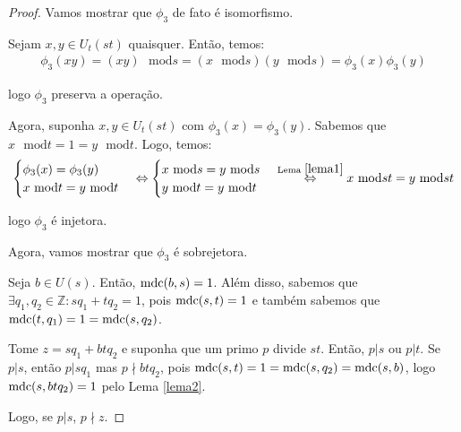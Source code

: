 \begin{proof}
		
		\vspace{0.3cm}\par Vamos mostrar que $\phi_3$ de fato é isomorfismo.
		\par\vspace{0.3cm} Sejam $x,y\in U_t(st)$ quaisquer. Então, temos:
		\begin{align*}
		\phi_3(xy) = (xy)\text{ }\mathrm{mod} s = (x\text{ }\mathrm{mod} s)(y\text{ }\mathrm{mod} s) = \phi_3(x)\phi_3(y)
		\end{align*}
		\par\vspace{0.3cm}logo $\phi_3$ preserva a operação.
		\par\vspace{0.3cm} Agora, suponha $x,y\in U_t(st)$ com $\phi_3(x) = \phi_3(y)$. Sabemos que $x\text{ }\mathrm{mod} t = 1 = y\text{ }\mathrm{mod} t$. Logo, temos:
		\begin{align*}
		\begin{cases}
		\phi_3(x) = \phi_3(y) \\
		x\text{ }\mathrm{mod} t = y\text{ }\mathrm{mod} t
		\end{cases}\Leftrightarrow
		\begin{cases}
		x\text{ }\mathrm{mod} s = y\text{ }\mathrm{mod} s \\
		y\text{ }\mathrm{mod} t = y\text{ }\mathrm{mod} t
		\end{cases} \overset{\text{Lema } \eqref{lema1}}{\Leftrightarrow } x\text{ }\mathrm{mod} {st} = y\text{ }\mathrm{mod} {st} 
		\end{align*}
		\par\vspace{0.3cm}logo $\phi_3$ é injetora. 
		\par\vspace{0.3cm} Agora, vamos mostrar que $\phi_3$ é sobrejetora.
		\par\vspace{0.3cm} Seja $b\in U(s)$. Então, $\operatorname{mdc}(b,s) = 1$. Além disso, sabemos que $\exists q_1, q_2\in\mathbb{Z}: sq_1 + tq_2 = 1$, pois $\operatorname{mdc}(s,t) = 1$ e também sabemos que $\operatorname{mdc}(t,q_1) = 1 = \operatorname{mdc}(s, q_2)$. 
		\par\vspace{0.3cm} Tome $z = sq_1 + btq_2$ e suponha que um primo $p$ divide $st$. Então, $p|s$ ou $p|t$. Se $p|s$, então $p|sq_1$ mas $p\nmid btq_2$, pois $\operatorname{mdc}(s,t) = 1 = \operatorname{mdc}(s,q_2) = \operatorname{mdc}(s,b)$, logo $\operatorname{mdc}(s, btq_2) = 1$ pelo Lema \eqref{lema2}. 
		\par\vspace{0.3cm} Logo, se $p|s$, $p\nmid z$.

\end{proof}
